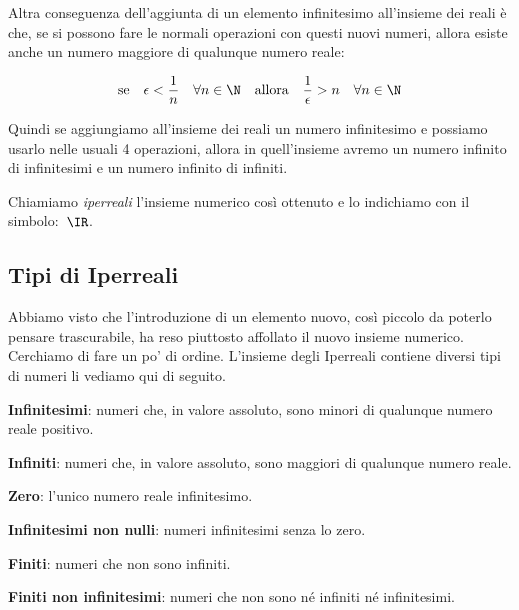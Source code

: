 Altra conseguenza dell'aggiunta di un elemento infinitesimo all'insieme dei 
reali è che, se si possono fare le normali operazioni con questi nuovi 
numeri, allora esiste anche un numero maggiore di qualunque numero reale:


\[\text{se} \quad \epsilon < \frac{1}{n} \quad \forall n \in \N 
\quad \text{allora} \quad \frac{1}{\epsilon} > n \quad \forall n 
\in \N\]

Quindi se aggiungiamo all'insieme dei reali un numero infinitesimo e possiamo 
usarlo nelle usuali 4 operazioni, allora in quell'insieme avremo un 
numero infinito di infinitesimi e un numero infinito di infiniti.

Chiamiamo \emph{iperreali} l'insieme numerico così ottenuto e lo indichiamo 
con il simbolo:~$\IR$.

\subsection{Tipi di Iperreali}
\label{subsec:insnum_iperreali}

Abbiamo visto che l'introduzione di un elemento nuovo, così piccolo
da poterlo pensare trascurabile, ha reso piuttosto affollato il nuovo 
insieme numerico. 
Cerchiamo di fare un po' di ordine. 
L'insieme degli Iperreali contiene diversi tipi di numeri li vediamo qui di 
seguito.

\begin{description} %
 \item \textbf{Infinitesimi}:
numeri che, in valore assoluto, sono minori di qualunque numero reale 
positivo.
 \item \textbf{Infiniti}:
numeri che, in valore assoluto, sono maggiori di qualunque numero reale.
 \item \textbf{Zero}:
l'unico numero reale infinitesimo.
 \item \textbf{Infinitesimi non nulli}:
numeri infinitesimi senza lo zero.
 \item \textbf{Finiti}:
numeri che non sono infiniti.
 \item \textbf{Finiti non infinitesimi}:
numeri che non sono né infiniti né infinitesimi.
\end{description}

